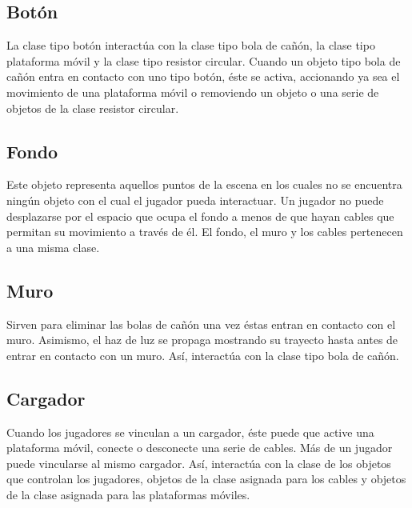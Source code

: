 \documentclass{article}
\begin{document}
\subsection{Botón}
La clase tipo botón interactúa con la clase tipo bola de cañón, la clase tipo plataforma móvil y la clase tipo resistor circular. Cuando un objeto tipo bola de cañón entra en contacto con uno tipo botón, éste se activa, accionando ya sea el movimiento de una plataforma móvil o removiendo un objeto o una serie de objetos de la clase resistor circular.
\subsection{Fondo}
Este objeto representa aquellos puntos de la escena en los cuales no se encuentra ningún objeto con el cual el jugador pueda interactuar. Un jugador no puede desplazarse por el espacio que ocupa el fondo a menos de que hayan cables que permitan su movimiento a través de él. El fondo, el muro y los cables pertenecen a una misma clase.
\subsection{Muro}
Sirven para eliminar las bolas de cañón una vez éstas entran en contacto con el muro. Asimismo, el haz de luz se propaga mostrando su trayecto hasta antes de entrar en contacto con un muro. Así, interactúa con la clase tipo bola de cañón.
\subsection{Cargador}
Cuando los jugadores se vinculan a un cargador, éste puede que active una plataforma móvil, conecte o desconecte una serie de cables. Más de un jugador puede vincularse al mismo cargador. Así, interactúa con la clase de los objetos que controlan los jugadores, objetos de la clase asignada para los cables y objetos de la clase asignada para las plataformas móviles.
\end{document}
